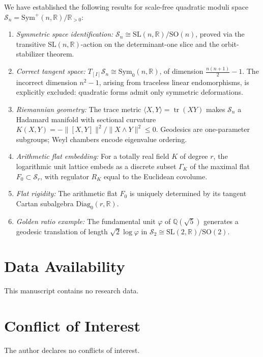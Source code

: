 \documentclass[12pt]{article}
\theoremstyle{definition}
\theoremstyle{remark}
\newcommand{\R}{\mathbb{R}}
\newcommand{\Q}{\mathbb{Q}}
\newcommand{\SL}{\mathrm{SL}}
\newcommand{\SO}{\mathrm{SO}}
\newcommand{\Symp}{\mathrm{Sym}^{+}}
\newcommand{\Symz}{\mathrm{Sym}_{0}}
\newcommand{\Diagz}{\mathrm{Diag}_{0}}
\newcommand{\calM}{\mathcal{S}}
\newcommand{\tr}{\operatorname{tr}}
\begin{document}
We have established the following results for scale-free quadratic
moduli space $\calM_n = \Symp(n,\R)/\R_{>0}$:

\begin{enumerate}
\item \emph{Symmetric space identification:}
      $\calM_n \cong \SL(n,\R)/\SO(n)$, proved via the transitive
      $\SL(n,\R)$-action on the determinant-one slice and the
      orbit-stabilizer theorem.

\item \emph{Correct tangent space:} $T_{[I]}\calM_n \cong \Symz(n,\R)$,
      of dimension $\frac{n(n+1)}{2}-1$.
      The incorrect dimension $n^2-1$, arising from traceless linear
      endomorphisms, is explicitly excluded: quadratic forms admit
      only symmetric deformations.

\item \emph{Riemannian geometry:} The trace metric $\langle X,Y\rangle
      = \tr(XY)$ makes $\calM_n$ a Hadamard manifold with sectional
      curvature $K(X,Y) = -\|[X,Y]\|^2/\|X\wedge Y\|^2 \leq 0$.
      Geodesics are one-parameter subgroups; Weyl chambers encode
      eigenvalue ordering.

\item \emph{Arithmetic flat embedding:} For a totally real field $K$
      of degree $r$, the logarithmic unit lattice embeds as a discrete
      subset $\Gamma_K$ of the maximal flat $F_0 \subset \calM_r$,
      with regulator $R_K$ equal to the Euclidean covolume.

\item \emph{Flat rigidity:} The arithmetic flat $F_0$ is uniquely
      determined by its tangent Cartan subalgebra $\Diagz(r,\R)$.

\item \emph{Golden ratio example:} The fundamental unit $\varphi$ of
      $\Q(\sqrt{5})$ generates a geodesic translation of length
      $\sqrt{2}\log\varphi$ in $\calM_2 \cong \SL(2,\R)/\SO(2)$.
\end{enumerate}


\section*{Data Availability}
This manuscript contains no research data.

\section*{Conflict of Interest}
The author declares no conflicts of interest.
\end{document}
